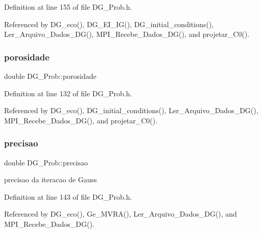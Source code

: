 Definition at line 155 of file D\+G\+\_\+\+Prob.\+h.



Referenced by D\+G\+\_\+eco(), D\+G\+\_\+\+E\+I\+\_\+\+I\+G(), D\+G\+\_\+initial\+\_\+conditions(), Ler\+\_\+\+Arquivo\+\_\+\+Dados\+\_\+\+D\+G(), M\+P\+I\+\_\+\+Recebe\+\_\+\+Dados\+\_\+\+D\+G(), and projetar\+\_\+\+C0().

\mbox{\label{classDG__Prob_a25479007d2b47d2601d831d6fdf0a77e}} 
\subsubsection{\texorpdfstring{porosidade}{porosidade}}
{\footnotesize\ttfamily double D\+G\+\_\+\+Prob\+::porosidade\hspace{0.3cm}{\ttfamily [private]}}



Definition at line 132 of file D\+G\+\_\+\+Prob.\+h.



Referenced by D\+G\+\_\+eco(), D\+G\+\_\+initial\+\_\+conditions(), Ler\+\_\+\+Arquivo\+\_\+\+Dados\+\_\+\+D\+G(), M\+P\+I\+\_\+\+Recebe\+\_\+\+Dados\+\_\+\+D\+G(), and projetar\+\_\+\+C0().

\mbox{\label{classDG__Prob_aab5dca55ee328d1c77a7439ea90367a6}} 
\subsubsection{\texorpdfstring{precisao}{precisao}}
{\footnotesize\ttfamily double D\+G\+\_\+\+Prob\+::precisao\hspace{0.3cm}{\ttfamily [private]}}



precisao da iteracao de Gauss 



Definition at line 143 of file D\+G\+\_\+\+Prob.\+h.



Referenced by D\+G\+\_\+eco(), Ge\+\_\+\+M\+V\+R\+A(), Ler\+\_\+\+Arquivo\+\_\+\+Dados\+\_\+\+D\+G(), and M\+P\+I\+\_\+\+Recebe\+\_\+\+Dados\+\_\+\+D\+G().

\mbox{\label{classDG__Prob_a77093932267aeaf6bb31c8b852dbecab}} 
